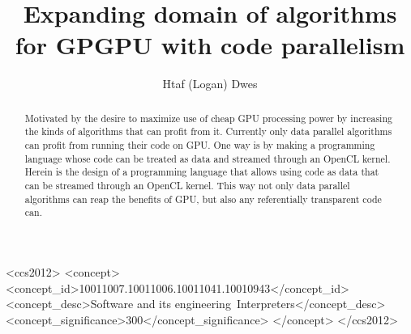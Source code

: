 \documentclass[sigconf]{acmart}
\begin{document}
\title[VM on OpenCL]{Expanding domain of algorithms for GPGPU with code
parallelism}


\author{Htaf (Logan) Dwes}

\renewcommand{\shortauthors}{Logan Dwes}


\begin{abstract}%
Motivated by the desire to maximize use of cheap GPU processing power by
increasing the kinds of algorithms that can profit from it.
Currently only data parallel algorithms can profit from running their code on 
GPU.\@
One way is by making a programming language whose code can be treated as data 
and streamed through an OpenCL kernel. 
Herein is the design of a programming language that allows using code as data
that can be streamed through an OpenCL kernel. 
This way not only data parallel
algorithms can reap the benefits of GPU, but also any referentially transparent
code can. 
\end{abstract}

%
%

\begin{CCSXML}
<ccs2012>
<concept>
<concept_id>10011007.10011006.10011041.10010943</concept_id>
<concept_desc>Software and its engineering~Interpreters</concept_desc>
<concept_significance>300</concept_significance>
</concept>
</ccs2012>
\end{CCSXML}







%


 
\end{document}
